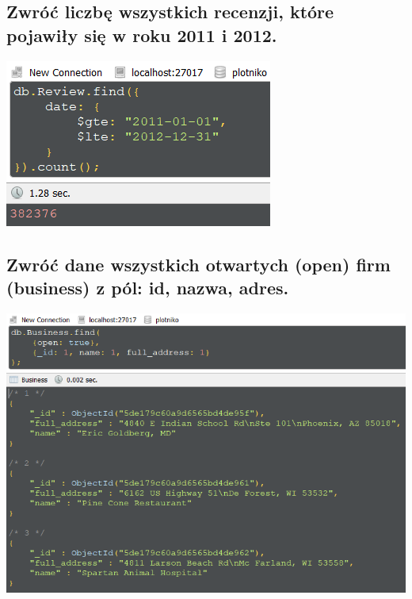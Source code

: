 \documentclass[a4paper, 11pt]{article}
\begin{document}
    \newpage

    \subsection{Zwróć liczbę wszystkich recenzji, które pojawiły się w roku 2011 i 2012.}

    

    \begin{center}
        \includegraphics{images/task1/1b.png}
    \end{center}

    \newpage

    \subsection{Zwróć dane wszystkich otwartych (open) firm (business) z pól: id, nazwa, adres.}

    

    \begin{center}
        \includegraphics{images/task1/1c.png}
    \end{center}
\end{document}
